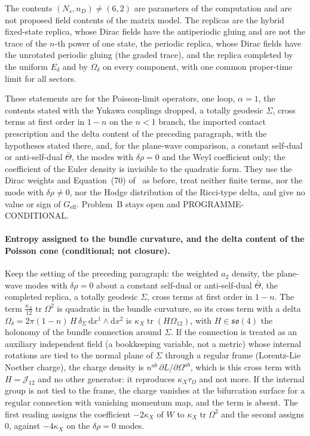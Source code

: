 The contents \((N_s,n_D)\neq(6,2)\) are parameters of the computation and are not proposed field contents of the matrix model. The replicas are the hybrid fixed-state replica, whose Dirac fields have the antiperiodic gluing and are not the trace of the \(n\)-th power of one state, the periodic replica, whose Dirac fields have the unrotated periodic gluing (the graded trace), and the replica completed by the uniform \(E_\delta\) and by \(\Omega_\delta\) on every component, with one common proper-time limit for all sectors.

These statements are for the Poisson-limit operators, one loop, \(\alpha=1\), the contents stated with the Yukawa couplings dropped, a totally geodesic \(\Sigma\), cross terms at first order in \(1-n\) on the \(n<1\) branch, the imported contact prescription and the delta content of the preceding paragraph, with the hypotheses stated there, and, for the plane-wave comparison, a constant self-dual or anti-self-dual \(\bar\Theta\), the modes with \(\delta\rho=0\) and the Weyl coefficient only; the coefficient of the Euler density is invisible to the quadratic form. They use the Dirac weights and Equation~(70) of~\cite{Solodukhin2011} as before, treat neither finite terms, nor the mode with \(\delta\rho\neq0\), nor the Hodge distribution of the Ricci-type delta, and give no value or sign of \(G_{\mathrm{eff}}\). Problem~B stays open and PROGRAMME-CONDITIONAL.

\paragraph{Entropy assigned to the bundle curvature, and the delta content of the Poisson cone (conditional; not closure).}
Keep the setting of the preceding paragraph: the weighted \(a_2\) density, the plane-wave modes with \(\delta\rho=0\) about a constant self-dual or anti-self-dual \(\bar\Theta\), the completed replica, a totally geodesic \(\Sigma\), cross terms at first order in \(1-n\). The term \(\tfrac{\kappa_X}{12}\operatorname{tr}\Omega^2\) is quadratic in the bundle curvature, so its cross term with a delta \(\Omega_\delta=2\pi(1-n)\,H\,\delta_\Sigma\,\mathrm dx^1\wedge\mathrm dx^2\) is \(\kappa_X\operatorname{tr}(H\Omega_{12})\), with \(H\in\mathfrak{so}(4)\) the holonomy of the bundle connection around \(\Sigma\). If the connection is treated as an auxiliary independent field (a bookkeeping variable, not a metric) whose internal rotations are tied to the normal plane of \(\Sigma\) through a regular frame (Lorentz-Lie Noether charge), the charge density is \(n^{ab}\,\partial L/\partial\Omega^{ab}\), which is this cross term with \(H=\mathcal J_{12}\) and no other generator: it reproduces \(\kappa_X\tau_\Omega\) and not more. If the internal group is not tied to the frame, the charge vanishes at the bifurcation surface for a regular connection with vanishing momentum map, and the term is absent. The first reading assigns the coefficient \(-2\kappa_X\) of \(W\) to \(\kappa_X\operatorname{tr}\Omega^2\) and the second assigns \(0\), against \(-4\kappa_X\) on the \(\delta\rho=0\) modes.

